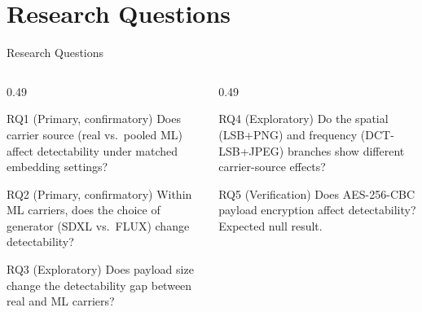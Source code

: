 \documentclass[aspectratio=169,11pt]{beamer}
\begin{document}
\section{Research Questions}
\begin{frame}{Research Questions}
\scriptsize
\begin{columns}[T]
\begin{column}{0.49\textwidth}
\begin{block}{RQ1 (Primary, confirmatory)}
Does carrier source (real vs.\ pooled ML) affect detectability under matched embedding settings?
\end{block}
\begin{block}{RQ2 (Primary, confirmatory)}
Within ML carriers, does the choice of generator (SDXL vs.\ FLUX) change detectability?
\end{block}
\begin{block}{RQ3 (Exploratory)}
Does payload size change the detectability gap between real and ML carriers?
\end{block}
\end{column}
\begin{column}{0.49\textwidth}
\begin{block}{RQ4 (Exploratory)}
Do the spatial (LSB+PNG) and frequency (DCT-LSB+JPEG) branches show different carrier-source effects?
\end{block}
\begin{block}{RQ5 (Verification)}
Does AES-256-CBC payload encryption affect detectability? Expected null result.
\end{block}
\end{column}
\end{columns}
\end{frame}

\end{document}
